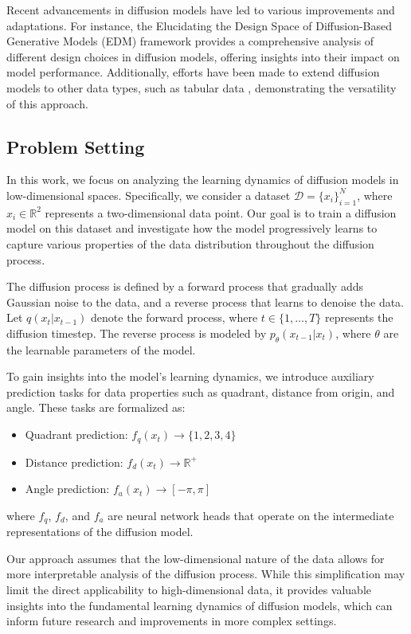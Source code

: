 \documentclass{article} %
\begin{document}
Recent advancements in diffusion models have led to various improvements and adaptations. For instance, the Elucidating the Design Space of Diffusion-Based Generative Models (EDM) framework \cite{edm} provides a comprehensive analysis of different design choices in diffusion models, offering insights into their impact on model performance. Additionally, efforts have been made to extend diffusion models to other data types, such as tabular data \cite{kotelnikov2022tabddpm}, demonstrating the versatility of this approach.

\subsection{Problem Setting}
In this work, we focus on analyzing the learning dynamics of diffusion models in low-dimensional spaces. Specifically, we consider a dataset $\mathcal{D} = \{x_i\}_{i=1}^{N}$, where $x_i \in \mathbb{R}^2$ represents a two-dimensional data point. Our goal is to train a diffusion model on this dataset and investigate how the model progressively learns to capture various properties of the data distribution throughout the diffusion process.

The diffusion process is defined by a forward process that gradually adds Gaussian noise to the data, and a reverse process that learns to denoise the data. Let $q(x_t|x_{t-1})$ denote the forward process, where $t \in \{1, \ldots, T\}$ represents the diffusion timestep. The reverse process is modeled by $p_\theta(x_{t-1}|x_t)$, where $\theta$ are the learnable parameters of the model.

To gain insights into the model's learning dynamics, we introduce auxiliary prediction tasks for data properties such as quadrant, distance from origin, and angle. These tasks are formalized as:

\begin{itemize}
    \item Quadrant prediction: $f_q(x_t) \rightarrow \{1, 2, 3, 4\}$
    \item Distance prediction: $f_d(x_t) \rightarrow \mathbb{R}^+$
    \item Angle prediction: $f_a(x_t) \rightarrow [-\pi, \pi]$
\end{itemize}

where $f_q$, $f_d$, and $f_a$ are neural network heads that operate on the intermediate representations of the diffusion model.

Our approach assumes that the low-dimensional nature of the data allows for more interpretable analysis of the diffusion process. While this simplification may limit the direct applicability to high-dimensional data, it provides valuable insights into the fundamental learning dynamics of diffusion models, which can inform future research and improvements in more complex settings.
\end{document}

